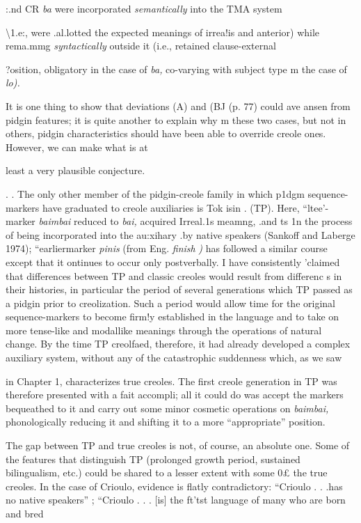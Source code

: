 :.nd CR \textit{ba }were incorporated \textit{semantically }into the TMA system

{\textbackslash}1.e:, were .al.lotted the expected meanings of irrea!is and anterior) while rema.mmg \textit{syntactically }outside it (i.e., retained clause-external

?osition, obligatory in the case of \textit{ba, }co-varying with subject type m the case of \textit{lo).}

It is one thing to show that deviations (A) and (BJ (p. 77) could ave ansen from pidgin features; it is quite another to explain why m these two cases, but not in others, pidgin characteristics should have been able to override creole ones. However, we can make what is at

least a very plausible conjecture.

. . The only other member of the pidgin-creole family in which p1dgm sequence-markers have graduated to creole auxiliaries is Tok isin . (TP). Here, ``ltee'-marker \textit{baimbai }reduced to \textit{bai, }acquired Irreal.1s meamng, .and ts 1n the process of being incorporated into the au:xihary .by native speakers (Sankoff and Laberge 1974); ``earlier{\textquotedbl}\-marker \textit{pinis} (from Eng. \textit{finish} \textit{)} has followed a similar course except that it ontinues to occur only postverbally. I have consistently 'claimed that differences between TP and classic creoles would result from differenc s in their histories, in particular the period of several genera\-tions which TP passed as a pidgin prior to creolization. Such a period would allow time for the original sequence-markers to become firm!y established in the language and to take on more tense-like and modal\-like meanings through the operations of natural change. By the time TP creolfaed, therefore, it had already developed a complex auxiliary system, without any of the catastrophic suddenness which, as we saw


in Chapter 1, characterizes true creoles. The first creole generation in TP was therefore presented with a fait accompli; all it could do was accept the markers bequeathed to it and carry out some minor cosmetic operations on \textit{baimbai,} phonologically reducing it and shifting it to a more ``appropriate'' position.

The gap between TP and true creoles is not, of course, an abso\-lute one. Some of the features that distinguish TP (prolonged growth period, sustained bilingualism, etc.) could be shared to a lesser extent with some 0£ the true creoles. In the case of Crioulo, evidence is flatly contradictory: ``Crioulo . . .has no native speakers'' \citep{Alleyne1979}; ``Crioulo . . . [is] the ft'tst language of many who are born and bred

